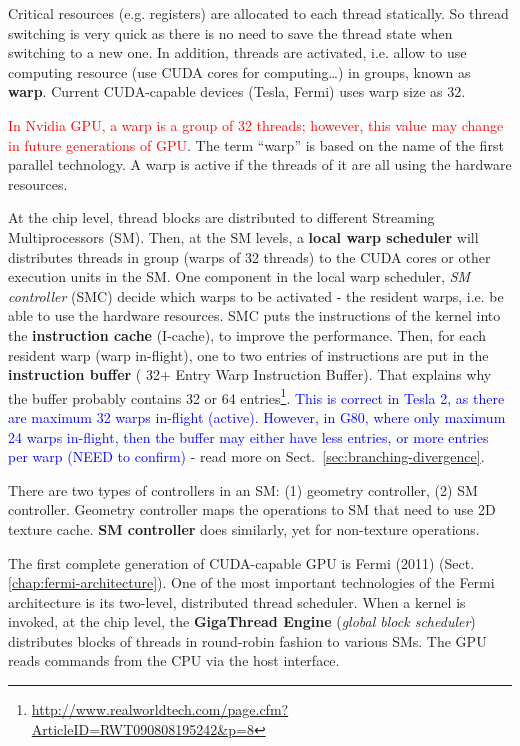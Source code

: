 Critical resources (e.g. registers) are allocated to each thread statically. So
thread switching is very quick as there is no need to save the thread state when
switching to a new one. In addition, threads are activated, i.e. allow to use
computing resource (use CUDA cores for computing\ldots) in groups, known as {\bf
warp}. Current CUDA-capable devices (Tesla, Fermi) uses warp size as 32. 

\begin{framed}
  \textcolor{red}{In Nvidia GPU, a warp is a group of 32 threads;
    however, this value may change in future generations of GPU}.
  The term ``warp'' is based on the name of the first parallel
  technology.  A warp is active if the threads of it are all using the
  hardware resources.
\end{framed}

At the chip level, thread blocks are distributed to different Streaming
Multiprocessors (SM). Then, at the SM levels, a {\bf local warp scheduler} will
distributes threads in group (warps of 32 threads) to the CUDA cores or other
execution units in the SM.  One  component in the local warp  scheduler, {\it SM
controller} (SMC) decide which warps to be  activated - the resident warps, i.e.
be able to use the hardware resources.  SMC puts the  instructions of the kernel
into the {\bf  instruction cache} (I-cache),  to improve the performance. Then,
for each resident warp (warp in-flight), one to two entries of instructions are
put in the {\bf instruction buffer} ( 32+ Entry Warp Instruction Buffer). That
explains why the buffer probably contains 32 or 64
entries\footnote{\url{http://www.realworldtech.com/page.cfm?ArticleID=RWT090808195242&p=8}}.
\textcolor{blue}{This is correct in Tesla 2, as there are maximum 32
  warps in-flight (active). However, in G80, where only maximum 24 warps
  in-flight, then the buffer may either have less entries, or more entries per
  warp (NEED to confirm)}
- read more on Sect.~\ref{sec:branching-divergence}.

\begin{framed}
  There are two types of controllers in an SM: (1) geometry
  controller, (2) SM controller. Geometry controller maps the
  operations to SM that need to use 2D texture cache.
  {\bf SM controller} does similarly, yet for non-texture operations.
\end{framed}

The first complete generation of CUDA-capable GPU is Fermi (2011)
(Sect.\ref{chap:fermi-architecture}). One of the most important technologies of
the Fermi architecture is its two-level, distributed thread scheduler. When a
kernel is invoked,  at the chip level, the {\bf GigaThread Engine} ({\it global
block scheduler}) distributes blocks of threads in round-robin fashion to
various SMs. The GPU reads commands from the CPU via the host interface. 


